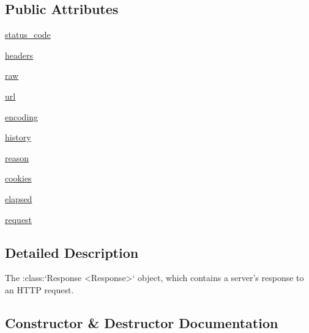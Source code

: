 \subsection*{Public Attributes}
\begin{DoxyCompactItemize}
\item 
\hyperlink{classpip_1_1__vendor_1_1requests_1_1models_1_1Response_a8ea52cd95e2e52e1a2f4ee99f5941a6c}{status\+\_\+code}
\item 
\hyperlink{classpip_1_1__vendor_1_1requests_1_1models_1_1Response_aa841d7da926368c1a73ad82b2cbbf7ea}{headers}
\item 
\hyperlink{classpip_1_1__vendor_1_1requests_1_1models_1_1Response_ae494befe56f72da498b39af7563cdcac}{raw}
\item 
\hyperlink{classpip_1_1__vendor_1_1requests_1_1models_1_1Response_a9e2a204fe904a0be97e661714d09d747}{url}
\item 
\hyperlink{classpip_1_1__vendor_1_1requests_1_1models_1_1Response_a7381941b1bef1b7c8b5b13acf38b82ac}{encoding}
\item 
\hyperlink{classpip_1_1__vendor_1_1requests_1_1models_1_1Response_a23083fcf45e3790da4693ab846ef4427}{history}
\item 
\hyperlink{classpip_1_1__vendor_1_1requests_1_1models_1_1Response_a7fc3460a41ab61b8e50eac6db373ab15}{reason}
\item 
\hyperlink{classpip_1_1__vendor_1_1requests_1_1models_1_1Response_abc1815d684e50a622a378054800ffa56}{cookies}
\item 
\hyperlink{classpip_1_1__vendor_1_1requests_1_1models_1_1Response_a95a831cc584e24a7c3891b6f6e831fe4}{elapsed}
\item 
\hyperlink{classpip_1_1__vendor_1_1requests_1_1models_1_1Response_a719e91c42e86bb61aaad3e980de6b99b}{request}
\end{DoxyCompactItemize}


\subsection{Detailed Description}
\begin{DoxyVerb}The :class:`Response <Response>` object, which contains a
server's response to an HTTP request.
\end{DoxyVerb}
 

\subsection{Constructor \& Destructor Documentation}
\mbox{\label{classpip_1_1__vendor_1_1requests_1_1models_1_1Response_a43f5a6248235e41dd1566c968c25f1e2}} 

